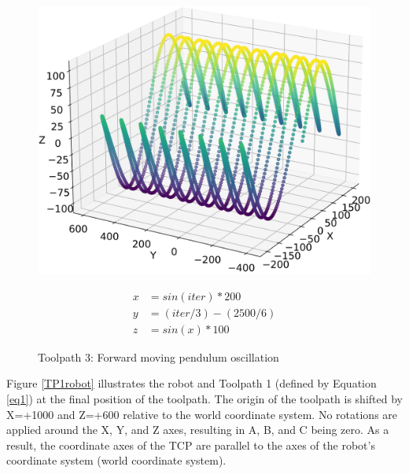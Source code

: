 \begin{figure}[H]%
	\centering
	\begin{minipage}{0.5\textwidth}
		\includegraphics[width=\textwidth]{figures/path3.png}
		\caption{Toolpath 3: Forward moving pendulum oscillation}
		\label{path3}
	\end{minipage}\hfill
	\begin{minipage}{0.5\textwidth}
		\begin{equation}\label{eq3}
			\begin{split}
				x &= sin(iter) * 200\\
				y &= (iter / 3) - (2500/6)\\
				z &= sin(x)*100
			\end{split}
		\end{equation}
	\end{minipage}\par
\end{figure}

\newpage
Figure \ref{TP1robot} illustrates the robot and Toolpath 1 (defined by Equation \ref{eq1}) at the final position of the toolpath. The origin of the toolpath is shifted by X=+1000 and Z=+600 relative to the world coordinate system. No rotations are applied around the X, Y, and Z axes, resulting in A, B, and C being zero. As a result, the coordinate axes of the \acrshort{TCP} are parallel to the axes of the robot's coordinate system (world coordinate system).



